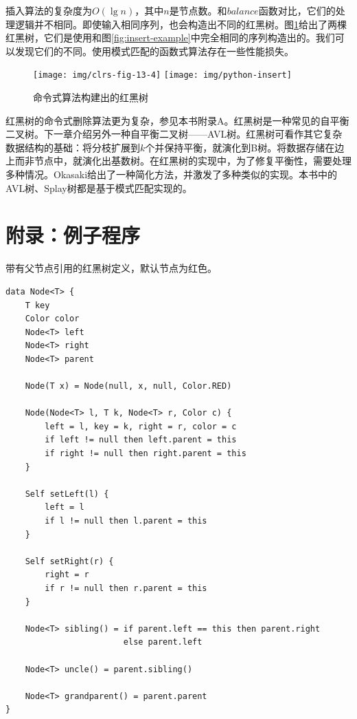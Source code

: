 \documentclass[b5paper]{ctexart}
\begin{document}
插入算法的复杂度为$O(\lg n)$，其中$n$是节点数。和$balance$函数对比，它们的处理逻辑并不相同。即使输入相同序列，也会构造出不同的红黑树。图\ref{fig:imperative-insert}给出了两棵红黑树，它们是使用和图\ref{fig:insert-example}中完全相同的序列构造出的。我们可以发现它们的不同。使用模式匹配的函数式算法存在一些性能损失\cite{okasaki}。

\begin{figure}[htbp]
   \centering
   \texttt{[image: img/clrs-fig-13-4]}
   \texttt{[image: img/python-insert]}
   \caption{命令式算法构建出的红黑树}
   \label{fig:imperative-insert}
\end{figure}

红黑树的命令式删除算法更为复杂，参见本书附录A。红黑树是一种常见的自平衡二叉树。下一章介绍另外一种自平衡二叉树——AVL树。红黑树可看作其它复杂数据结构的基础：将分枝扩展到$k$个并保持平衡，就演化到B树。将数据存储在边上而非节点中，就演化出基数树。在红黑树的实现中，为了修复平衡性，需要处理多种情况。Okasaki给出了一种简化方法，并激发了多种类似的实现\cite{rosetta}。本书中的AVL树、Splay树都是基于模式匹配实现的。

\section{附录：例子程序}

带有父节点引用的红黑树定义，默认节点为红色。

\begin{lstlisting}[language = Bourbaki]
data Node<T> {
    T key
    Color color
    Node<T> left
    Node<T> right
    Node<T> parent

    Node(T x) = Node(null, x, null, Color.RED)

    Node(Node<T> l, T k, Node<T> r, Color c) {
        left = l, key = k, right = r, color = c
        if left != null then left.parent = this
        if right != null then right.parent = this
    }

    Self setLeft(l) {
        left = l
        if l != null then l.parent = this
    }

    Self setRight(r) {
        right = r
        if r != null then r.parent = this
    }

    Node<T> sibling() = if parent.left == this then parent.right
                        else parent.left

    Node<T> uncle() = parent.sibling()

    Node<T> grandparent() = parent.parent
}
\end{lstlisting}
\end{document}
